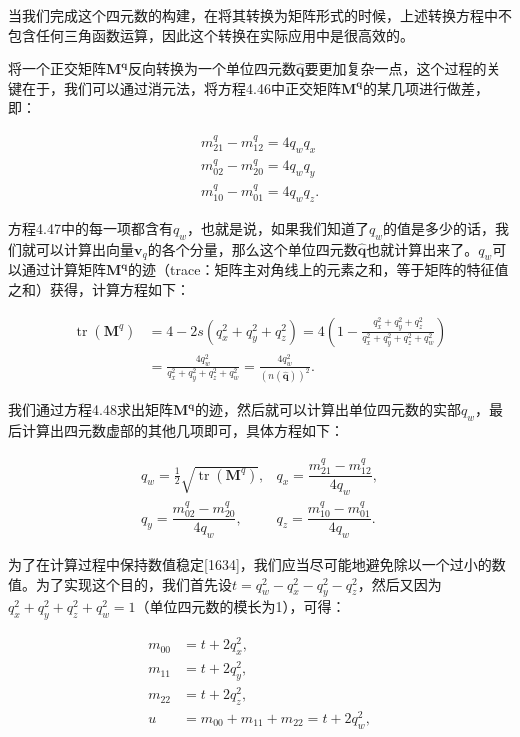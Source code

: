 \documentclass[
  paper=a4,
  ,captions=tableheading
]{scrartcl}
\begin{document}
当我们完成这个四元数的构建，在将其转换为矩阵形式的时候，上述转换方程中不包含任何三角函数运算，因此这个转换在实际应用中是很高效的。

将一个正交矩阵\(\mathbf{M^q}\)反向转换为一个单位四元数\(\mathbf{\hat{q}}\)要更加复杂一点，这个过程的关键在于，我们可以通过消元法，将方程4.46中正交矩阵\(\mathbf{M^q}\)的某几项进行做差，即：

\[
  \begin{array}{l}m_{21}^{q}-m_{12}^{q}=4 q_{w} q_{x} \\ m_{02}^{q}-m_{20}^{q}=4 q_{w} q_{y} \\ m_{10}^{q}-m_{01}^{q}=4 q_{w} q_{z} .\end{array}
  \tag{4.47}
\]

方程4.47中的每一项都含有\(q_w\)，也就是说，如果我们知道了\(q_w\)的值是多少的话，我们就可以计算出向量\(\mathbf{v}_q\)的各个分量，那么这个单位四元数\(\mathbf{\hat{q}}\)也就计算出来了。\(q_w\)可以通过计算矩阵\(\mathbf{M^q}\)的迹（trace：矩阵主对角线上的元素之和，等于矩阵的特征值之和）获得，计算方程如下：

\[
  \begin{aligned} \operatorname{tr}\left(\mathbf{M}^{q}\right) & =4-2 s\left(q_{x}^{2}+q_{y}^{2}+q_{z}^{2}\right)=4\left(1-\frac{q_{x}^{2}+q_{y}^{2}+q_{z}^{2}}{q_{x}^{2}+q_{y}^{2}+q_{z}^{2}+q_{w}^{2}}\right) \\ & =\frac{4 q_{w}^{2}}{q_{x}^{2}+q_{y}^{2}+q_{z}^{2}+q_{w}^{2}}=\frac{4 q_{w}^{2}}{(n(\hat{\mathbf{q}}))^{2}} .\end{aligned}
  \tag{4.48}
\]

我们通过方程4.48求出矩阵\(\mathbf{M^q}\)的迹，然后就可以计算出单位四元数的实部\(q_w\)，最后计算出四元数虚部的其他几项即可，具体方程如下：

\[
  \begin{array}{ll}q_{w}=\frac{1}{2} \sqrt{\operatorname{tr}\left(\mathbf{M}^{q}\right)}, & q_{x}=\dfrac{m_{21}^{q}-m_{12}^{q}}{4 q_{w}}, \\[3mm] q_{y}=\dfrac{m_{02}^{q}-m_{20}^{q}}{4 q_{w}}, & q_{z}=\dfrac{m_{10}^{q}-m_{01}^{q}}{4 q_{w}} .\end{array}
  \tag{4.49}
\]

为了在计算过程中保持数值稳定{[}1634{]}，我们应当尽可能地避免除以一个过小的数值。为了实现这个目的，我们首先设\(t=q_{w}^{2}-q_{x}^{2}-q_{y}^{2}-q_{z}^{2}\)，然后又因为\(q_{x}^{2}+q_{y}^{2}+q_{z}^{2}+q_{w}^{2} = 1\)（单位四元数的模长为1），可得：

\[
  \begin{aligned}
    m_{00} & =t+2 q_{x}^{2}, \\ m_{11} &=t+2 q_{y}^{2}, \\ m_{22} &=t+2 q_{z}^{2}, \\ u &=m_{00}+m_{11}+m_{22}=t+2 q_{w}^{2},
  \end{aligned}
  \tag{4.50}
\]
\end{document}
